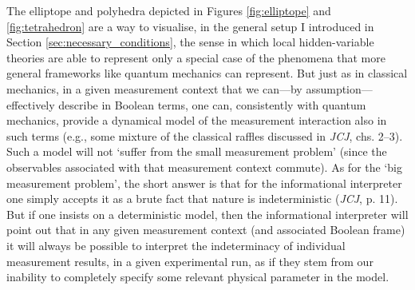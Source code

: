 \documentclass[12pt,english,twoside]{article}
\numberwithin{equation}{section}
\begin{document}
The elliptope and polyhedra depicted in Figures \ref{fig:elliptope} and \ref{fig:tetrahedron} are a way to visualise, in the general setup I introduced in Section \ref{sec:necessary_conditions}, the sense in which local hidden-variable theories are able to represent only a special case of the phenomena that more general frameworks like quantum mechanics can represent. But just as in classical mechanics, in a given measurement context that we can---by assumption---effectively describe in Boolean terms, one can, consistently with quantum mechanics, provide a dynamical model of the measurement interaction also in such terms (e.g., some mixture of the classical raffles discussed in \emph{JCJ}, chs. 2--3). Such a model will not `suffer from the small measurement problem' (since the observables associated with that measurement context commute). As for the `big measurement problem', the short answer is that for the informational interpreter one simply accepts it as a brute fact that nature is indeterministic (\emph{JCJ}, p. 11). But if one insists on a deterministic model, then the informational interpreter will point out that in any given measurement context (and associated Boolean frame) it will always be possible to interpret the indeterminacy of individual measurement results, in a given experimental run, as if they stem from our inability to completely specify some relevant physical parameter in the model.
\end{document}
